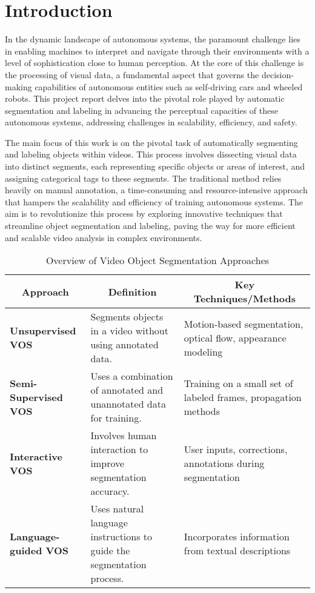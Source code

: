 \setcounter{equation}{0}

\chapter{Introduction}

In the dynamic landscape of autonomous systems, the paramount challenge lies in enabling machines to interpret and navigate through their environments with a level of sophistication close to human perception. At the core of this challenge is the processing of visual data, a fundamental aspect that governs the decision-making capabilities of autonomous entities such as self-driving cars and wheeled robots. This project report delves into the pivotal role played by automatic segmentation and labeling in advancing the perceptual capacities of these autonomous systems, addressing challenges in scalability, efficiency, and safety.

\noindent
The main focus of this work is on the pivotal task of automatically segmenting and labeling objects within videos. This process involves dissecting visual data into distinct segments, each representing specific objects or areas of interest, and assigning categorical tags to these segments. The traditional method relies heavily on manual annotation, a time-consuming and resource-intensive approach that hampers the scalability and efficiency of training autonomous systems. The aim is to revolutionize this process by exploring innovative techniques that streamline object segmentation and labeling, paving the way for more efficient and scalable video analysis in complex environments.\\

\clearpage
\begin{table}[htbp]
  \centering
  \begin{tabular}{|p{3.5cm}|p{5cm}|p{6cm}|}
    \hline
    \multicolumn{1}{|c|}{\textbf{Approach}} & \multicolumn{1}{c|}{\textbf{Definition}} & \multicolumn{1}{c|}{\textbf{Key Techniques/Methods}} \\
    \hline
    \centering\textbf{Unsupervised VOS} & Segments objects in a video without using annotated data. & Motion-based segmentation, optical flow, appearance modeling \\
    \hline
    \centering\textbf{Semi-Supervised VOS} & Uses a combination of annotated and unannotated data for training. & Training on a small set of labeled frames, propagation methods \\
    \hline
    \centering\textbf{Interactive VOS} & Involves human interaction to improve segmentation accuracy. & User inputs, corrections, annotations during segmentation \\
    \hline
    \centering\textbf{Language-guided VOS} & Uses natural language instructions to guide the segmentation process. & Incorporates information from textual descriptions \\
    \hline
  \end{tabular}
  \caption{Overview of Video Object Segmentation Approaches}
\end{table}

